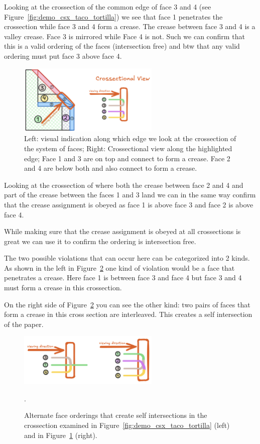 Looking at the crossection of the common edge of face 3 and 4 (see Figure~\ref{fig:demo_csx_taco_tortilla}) we see that face 1 penetrates the crossection while face 3 and 4 form a crease.
The crease between face 3 and 4 is a valley crease. Face 3 is mirrored while Face 4 is not.
Such we can confirm that this is a valid ordering of the faces (intersection free) and btw that any valid ordering must put face 3 above face 4.

\begin{figure}[h]
\centering
\includegraphics[width=0.6\textwidth]{assets/demo_csx_taco_taco.png}
\caption{Left: visual indication along which edge we look at the crossection of the system of faces; Right: Crossectional view along the highlighted edge; Face 1 and 3 are on top and connect to form a crease. Face 2 and 4 are below both and also connect to form a crease.}
\label{fig:demo_csx_taco_taco}
\end{figure}

Looking at the crossection of where both the crease between face 2 and 4 and part of the crease between the faces 1 and 3
land we can in the same way confirm that the crease assignment is obeyed as face 1 is above face 3 and face 2 is above face 4.

While making sure that the crease assignment is obeyed at all crossections is great we can use it to confirm the ordering is intersection free.

The two possible violations that can occur here can be categorized into 2 kinds.
As shown in the left in Figure~\ref{fig:demo_csx_bad_ordering} one kind of violation would be a face that penetrates a crease.
Here face 1 is between face 3 and face 4 but face 3 and 4 must form a crease in this crossection.

On the right side of Figure~\ref{fig:demo_csx_bad_ordering} you can see the other kind: two pairs of faces that form a crease in this cross section are interleaved.
This creates a self intersection of the paper.
 
\begin{figure}[h]
\centering
\includegraphics[width=0.6\textwidth]{assets/demo_csx_bad_ordering.png}
\caption{Alternate face orderings that create self intersections in the crossection examined in Figure~\ref{fig:demo_csx_taco_tortilla} (left) and in Figure~\ref{fig:demo_csx_taco_taco} (right).}.
\label{fig:demo_csx_bad_ordering}
\end{figure}

